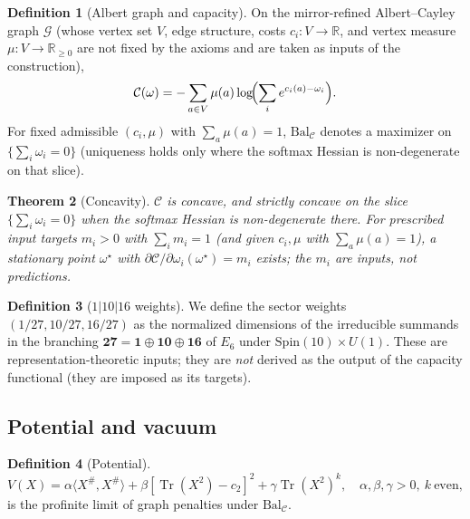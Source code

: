 \documentclass[aps,prd,onecolumn,amsmath,amssymb,nofootinbib,11pt]{revtex4-2}
\numberwithin{equation}{section}
\theoremstyle{plain}
\newtheorem{theorem}{Theorem}[section]
\theoremstyle{definition}
\newtheorem{definition}[theorem]{Definition}
\theoremstyle{remark}
\newcommand{\R}{\mathbb{R}}
\newcommand{\Tr}{\operatorname{Tr}}
\newcommand{\capacity}{\mathcal{C}}
\begin{document}
\begin{definition}[Albert graph and capacity]\label{def:capacity}
On the mirror-refined Albert--Cayley graph $\mathcal{G}$ (whose vertex set $V$, edge
structure, costs $c_i:V\to\R$, and vertex measure $\mu:V\to\R_{\ge0}$ are not fixed by the
axioms and are taken as inputs of the construction),
\begin{equation}\label{eq:capacity}
  \capacity(\omega)=-\sum_{a\in V}\mu(a)\log\!\Bigl(\sum_i e^{c_i(a)-\omega_i}\Bigr).
\end{equation}
For fixed admissible $(c_i,\mu)$ with $\sum_a\mu(a)=1$, $\mathrm{Bal}_{\mathcal{C}}$ denotes a
maximizer on $\{\sum_i\omega_i=0\}$ (uniqueness holds only where the softmax Hessian is
non-degenerate on that slice).
\end{definition}

\begin{theorem}[Concavity]\label{thm:concave}
$\capacity$ is concave, and strictly concave on the slice $\{\sum_i\omega_i=0\}$ when the
softmax Hessian is non-degenerate there. For prescribed input targets $m_i>0$ with
$\sum_i m_i=1$ (and given $c_i,\mu$ with $\sum_a\mu(a)=1$), a stationary point $\omega^\star$ with
$\partial\capacity/\partial\omega_i(\omega^\star)=m_i$ exists; the $m_i$ are inputs, not predictions.
\end{theorem}

\begin{definition}[$1|10|16$ weights]\label{thm:partition}
We define the sector weights $(1/27,10/27,16/27)$ as the normalized dimensions of the
irreducible summands in the branching $\mathbf{27}=\mathbf{1}\oplus\mathbf{10}\oplus\mathbf{16}$
of $E_6$ under $\mathrm{Spin}(10)\times U(1)$. These are representation-theoretic inputs; they
are \emph{not} derived as the output of the capacity functional (they are imposed as its targets).
\end{definition}

\subsection{Potential and vacuum}
\label{sec:universe:potential}

\begin{definition}[Potential]\label{def:potential}
\begin{equation}\label{eq:potential}
  V(X)=\alpha\langle X^{\#},X^{\#}\rangle+\beta[\Tr(X^2)-c_2]^2+\gamma\Tr(X^2)^k,
  \quad \alpha,\beta,\gamma>0,\ k\ \text{even},
\end{equation}
is the profinite limit of graph penalties under $\mathrm{Bal}_{\mathcal{C}}$.
\end{definition}
\end{document}
